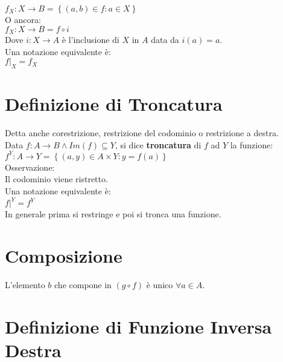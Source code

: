 \documentclass[a4paper, twoside, italian, 11pt]{book}
\newcommand{\braces}[1] {\left\{#1\right\}}
\begin{document}
$f_X : X \rightarrow B = \braces{(a, b) \in f : a \in X}$ \\

\noindent
O ancora: \\

$f_X : X \rightarrow B = f \circ i$ \\

\noindent
Dove $i : X \rightarrow A$ è l'inclusione di $X$ in $A$ data da $i(a) = a$. \\

\noindent
Una notazione equivalente è: \\

$f|_X = f_X$



\section{Definizione di Troncatura}

Detta anche corestrizione, restrizione del codominio o restrizione a destra. \\

\noindent
Data $f : A \rightarrow B \land Im(f) \subseteq Y$, si dice \textbf{troncatura} di $f$ ad $Y$ la funzione: \\

$f^Y : A \rightarrow Y = \braces{(a, y) \in A \times Y : y = f(a)}$ \\

\noindent
Osservazione: \\
Il codominio viene ristretto. \\

\noindent
Una notazione equivalente è: \\

$f|^Y = f^Y$ \\

\noindent
In generale prima si restringe e poi si tronca una funzione.



\section{Composizione}

L'elemento $b$ che compone in $(g \circ f)$ è unico $\forall a \in A$.



\section{Definizione di Funzione Inversa Destra}
\end{document}

